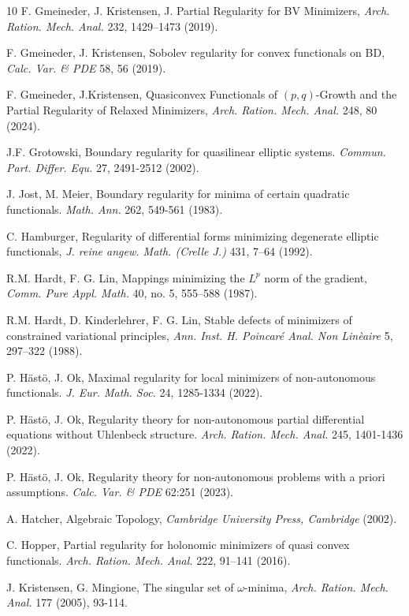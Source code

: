 \documentclass[a4paper]{amsart}
\theoremstyle{plain}  %
\numberwithin{equation}{section}
\begin{document}
\begin{thebibliography}{10}
 F. Gmeineder, J. Kristensen, J. Partial Regularity for BV Minimizers, \emph{Arch. Ration. Mech. Anal.} 232, 1429–1473 (2019).

 F. Gmeineder, J. Kristensen, Sobolev regularity for convex functionals on BD, \emph{Calc. Var. \& PDE} 58, 56 (2019).

 F. Gmeineder, J.Kristensen, Quasiconvex Functionals of $(p, q)$-Growth and the Partial Regularity of Relaxed Minimizers, \emph{Arch. Ration. Mech. Anal. } 248, 80 (2024).

 J.F. Grotowski, Boundary regularity for quasilinear elliptic systems. \emph{Commun. Part. Differ. Equ.} 27,  2491-2512 (2002).

 J. Jost, M. Meier, 
Boundary regularity for minima of certain quadratic functionals. 
\emph{Math. Ann.} 262, 549-561 (1983).

  C. Hamburger, Regularity of differential forms minimizing degenerate elliptic functionals, \emph{J. reine angew. Math. (Crelle J.)} 431, 7--64 (1992).


 R.M. Hardt, F. G. Lin, Mappings minimizing the $L^p$ norm of the gradient, \emph{Comm. Pure Appl. Math.} 40, no. 5, 555–588 (1987).

  R.M. Hardt, D. Kinderlehrer, F. G. Lin, Stable defects of minimizers of constrained variational principles, \emph{Ann. Inst. H. Poincaré Anal. Non Linèaire} 5, 297–322 (1988).

  P. H\"ast\"o, J. Ok, Maximal regularity for local minimizers of non-autonomous functionals. \emph{J. Eur. Math. Soc.} 24, 1285-1334 (2022).

  P. H\"ast\"o, J. Ok, 
Regularity theory for non-autonomous partial differential equations without Uhlenbeck structure. {\em Arch. Ration. Mech. Anal.}  245, 1401-1436 (2022). 

 P. H\"ast\"o, J. Ok, Regularity theory for non-autonomous problems with a priori assumptions. \emph{Calc. Var. \& PDE} 62:251 (2023).

 A. Hatcher, Algebraic Topology, \emph{Cambridge University Press, Cambridge} (2002).


  C. Hopper, Partial regularity for holonomic minimizers of quasi convex functionals. \emph{Arch. Ration. Mech.
 Anal.} 222, 91–141 (2016).

 J. Kristensen, G. Mingione, The
singular set of $\omega$-minima, \emph{Arch. Ration. Mech. Anal. } 177 (2005), 93-114.



\end{thebibliography}
\end{document}

